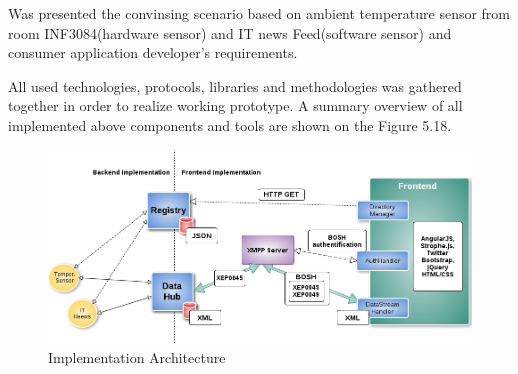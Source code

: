 Was presented the convinsing scenario based on ambient temperature sensor from room INF3084(hardware sensor) and IT news Feed(software sensor) and consumer application developer's requirements.

All used technologies, protocols, libraries and methodologies was gathered together in order to realize working prototype. A summary overview of all implemented above components and tools are shown on the Figure 5.18.
\begin{figure}[H]
\centering
\includegraphics[scale=0.5]{images/ch5Summary.png}   
\caption[Implementation Architecture]{Implementation Architecture}                         
\end{figure}

